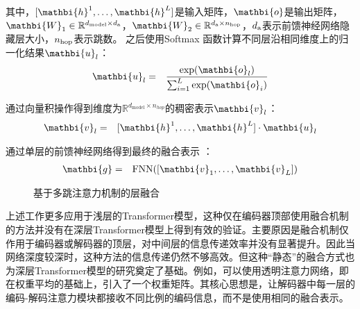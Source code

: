 \begin{itemize}
\noindent 其中，$[\mathbi{h}^1,\ldots,\mathbi{h}^L]$是输入矩阵，$\mathbi{o}$是输出矩阵，$\mathbi{W}_1 \in \mathbb{R}^{d_{\textrm{model}} \times d_{\rm a}}$，$\mathbi{W}_2 \in \mathbb{R}^{d_{\rm a}\times n_{\rm hop}}$，$d_{\rm a}$表示前馈神经网络隐藏层大小，$n_{\rm hop}$表示跳数。 之后使用Softmax 函数计算不同层沿相同维度上的归一化结果$\mathbi{u}_l$：
\begin{eqnarray}
\mathbi{u}_l &=& \frac{\textrm{exp}(\mathbi{o}_l)}{\sum_{i=1}^L{\textrm{exp}(\mathbi{o}_i)}}
\label{eq:15-34}
\end{eqnarray}

\noindent 通过向量积操作得到维度为$\mathbb{R}^{d_{\textrm{model}} \times n_{hop}}$的稠密表示$\mathbi{v}_l$：
\begin{eqnarray}
\mathbi{v}_l & = & [\mathbi{h}^1,\ldots,\mathbi{h}^L]\cdot \mathbi{u}_l 
\label{eq:15-35}
\end{eqnarray}

\noindent 通过单层的前馈神经网络得到最终的融合表示 ：
\begin{eqnarray}
\mathbi{g} & = & \textrm{FNN}([\mathbi{v}_1,\ldots,\mathbi{v}_L]) 
\label{eq:15-36}
\end{eqnarray}

\vspace{0.5em}
\end{itemize}

\begin{figure}[htp]
\centering

\caption{基于多跳注意力机制的层融合}
\label{fig:15-11}
\end{figure}

\parinterval 上述工作更多应用于浅层的Transformer模型，这种仅在编码器顶部使用融合机制的方法并没有在深层Transformer模型上得到有效的验证。主要原因是融合机制仅作用于编码器或解码器的顶层，对中间层的信息传递效率并没有显著提升。因此当网络深度较深时，这种方法的信息传递仍然不够高效。但这种“静态”的融合方式也为深层Transformer模型的研究奠定了基础。例如，可以使用透明注意力网络，即在权重平均的基础上，引入了一个权重矩阵。其核心思想是，让解码器中每一层的编码-解码注意力模块都接收不同比例的编码信息，而不是使用相同的融合表示。


